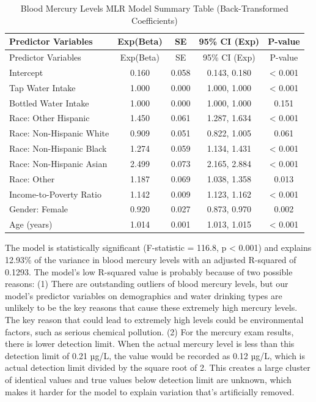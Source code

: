 \documentclass[
  letterpaper,
  DIV=11,
  numbers=noendperiod]{scrartcl}
\begin{document}
\begin{longtable}[]{@{}lcccc@{}}
\caption{Blood Mercury Levels MLR Model Summary Table (Back-Transformed
Coefficients)}\tabularnewline
\toprule\noalign{}
Predictor Variables & Exp(Beta) & SE & 95\% CI (Exp) & P-value \\
\midrule\noalign{}
\endfirsthead
\toprule\noalign{}
Predictor Variables & Exp(Beta) & SE & 95\% CI (Exp) & P-value \\
\midrule\noalign{}
\endhead
\bottomrule\noalign{}
\endlastfoot
Intercept & 0.160 & 0.058 & 0.143, 0.180 & \textless{} 0.001 \\
Tap Water Intake & 1.000 & 0.000 & 1.000, 1.000 & \textless{} 0.001 \\
Bottled Water Intake & 1.000 & 0.000 & 1.000, 1.000 & 0.151 \\
Race: Other Hispanic & 1.450 & 0.061 & 1.287, 1.634 & \textless{}
0.001 \\
Race: Non-Hispanic White & 0.909 & 0.051 & 0.822, 1.005 & 0.061 \\
Race: Non-Hispanic Black & 1.274 & 0.059 & 1.134, 1.431 & \textless{}
0.001 \\
Race: Non-Hispanic Asian & 2.499 & 0.073 & 2.165, 2.884 & \textless{}
0.001 \\
Race: Other & 1.187 & 0.069 & 1.038, 1.358 & 0.013 \\
Income-to-Poverty Ratio & 1.142 & 0.009 & 1.123, 1.162 & \textless{}
0.001 \\
Gender: Female & 0.920 & 0.027 & 0.873, 0.970 & 0.002 \\
Age (years) & 1.014 & 0.001 & 1.013, 1.015 & \textless{} 0.001 \\
\end{longtable}

The model is statistically significant (F-statistic = 116.8, p
\textless{} 0.001) and explains 12.93\% of the variance in blood mercury
levels with an adjusted R-squared of 0.1293. The model's low R-squared
value is probably because of two possible reasons: (1) There are
outstanding outliers of blood mercury levels, but our model's predictor
variables on demographics and water drinking types are unlikely to be
the key reasons that cause these extremely high mercury levels. The key
reason that could lead to extremely high levels could be environmental
factors, such as serious chemical pollution. (2) For the mercury exam
results, there is lower detection limit. When the actual mercury level
is less than this detection limit of 0.21 µg/L, the value would be
recorded as 0.12 µg/L, which is actual detection limit divided by the
square root of 2. This creates a large cluster of identical values and
true values below detection limit are unknown, which makes it harder for
the model to explain variation that's artificially removed.
\end{document}
